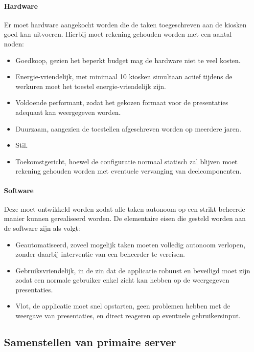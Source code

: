 \documentclass[a4paper,oneside,11pt,final]{memoir}
\begin{document}
\paragraph{Hardware} Er moet hardware aangekocht worden die de taken toegeschreven aan de kiosken goed kan uitvoeren. Hierbij moet rekening gehouden worden met een aantal noden:
\begin{itemize}
	\item Goedkoop, gezien het beperkt budget mag de hardware niet te veel kosten.
	\item Energie-vriendelijk, met minimaal 10 kiosken simultaan actief tijdens de werkuren moet het toestel energie-vriendelijk zijn.
	\item Voldoende performant, zodat het gekozen formaat voor de presentaties adequaat kan weergegeven worden.
	\item Duurzaam, aangezien de toestellen afgeschreven worden op meerdere jaren.
	\item Stil.
	\item Toekomstgericht, hoewel de configuratie normaal statisch zal blijven moet rekening gehouden worden met eventuele vervanging van deelcomponenten.
\end{itemize}

\paragraph{Software} Deze moet ontwikkeld worden zodat alle taken autonoom op een strikt beheerde manier kunnen gerealiseerd worden. De elementaire eisen die gesteld worden aan de software zijn als volgt:
\begin{itemize}
	\item Geautomatiseerd, zoveel mogelijk taken moeten volledig autonoom verlopen, zonder daarbij interventie van een beheerder te vereisen.
	\item Gebruiksvriendelijk, in de zin dat de applicatie robuust en beveiligd moet zijn zodat een normale gebruiker enkel zicht kan hebben op de weergegeven presentaties.	
	\item Vlot, de applicatie moet snel opstarten, geen problemen hebben met de weergave van presentaties, en direct reageren op eventuele gebruikersinput.
\end{itemize}

\subsection{Samenstellen van primaire server}
\end{document}
